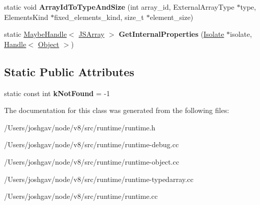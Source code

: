 \begin{DoxyCompactItemize}
\item 
static void {\bfseries Array\+Id\+To\+Type\+And\+Size} (int array\+\_\+id, External\+Array\+Type $\ast$type, Elements\+Kind $\ast$fixed\+\_\+elements\+\_\+kind, size\+\_\+t $\ast$element\+\_\+size)\hypertarget{classv8_1_1internal_1_1_runtime_a4894a14ef5a1474a7a736c55770fbee3}{}\label{classv8_1_1internal_1_1_runtime_a4894a14ef5a1474a7a736c55770fbee3}

\item 
static \hyperlink{classv8_1_1internal_1_1_maybe_handle}{Maybe\+Handle}$<$ \hyperlink{classv8_1_1internal_1_1_j_s_array}{J\+S\+Array} $>$ {\bfseries Get\+Internal\+Properties} (\hyperlink{classv8_1_1internal_1_1_isolate}{Isolate} $\ast$isolate, \hyperlink{classv8_1_1internal_1_1_handle}{Handle}$<$ \hyperlink{classv8_1_1internal_1_1_object}{Object} $>$)\hypertarget{classv8_1_1internal_1_1_runtime_a160c8a6a276c94cdc522483e36c2347b}{}\label{classv8_1_1internal_1_1_runtime_a160c8a6a276c94cdc522483e36c2347b}

\end{DoxyCompactItemize}
\subsection*{Static Public Attributes}
\begin{DoxyCompactItemize}
\item 
static const int {\bfseries k\+Not\+Found} = -\/1\hypertarget{classv8_1_1internal_1_1_runtime_a15cd342f4d259e6ca8751f01bf7915be}{}\label{classv8_1_1internal_1_1_runtime_a15cd342f4d259e6ca8751f01bf7915be}

\end{DoxyCompactItemize}


The documentation for this class was generated from the following files\+:\begin{DoxyCompactItemize}
\item 
/\+Users/joshgav/node/v8/src/runtime/runtime.\+h\item 
/\+Users/joshgav/node/v8/src/runtime/runtime-\/debug.\+cc\item 
/\+Users/joshgav/node/v8/src/runtime/runtime-\/object.\+cc\item 
/\+Users/joshgav/node/v8/src/runtime/runtime-\/typedarray.\+cc\item 
/\+Users/joshgav/node/v8/src/runtime/runtime.\+cc\end{DoxyCompactItemize}
